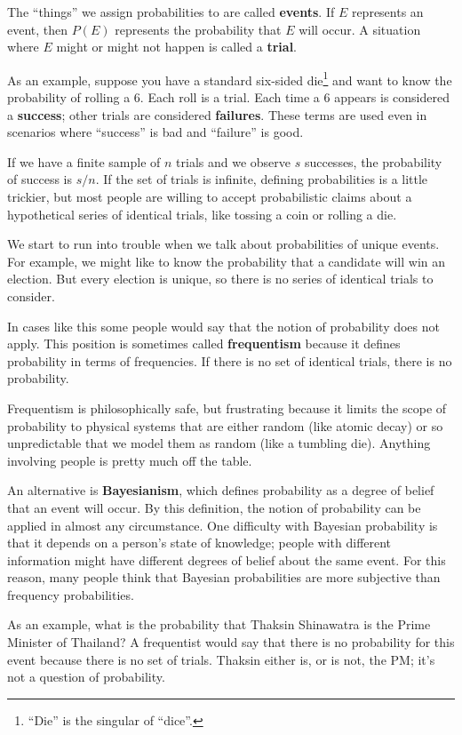 \documentclass[12pt]{book}
\begin{document}
The ``things'' we assign probabilities to are called {\bf events}.  If
$E$ represents an event, then $P(E)$ represents the probability that
$E$ will occur.  A situation where $E$ might or might not happen is
called a {\bf trial}.

As an example, suppose you have a standard six-sided
die\footnote{``Die'' is the singular of ``dice''.} and want to know
the probability of rolling a 6.  Each roll is a trial.
Each time a 6 appears is considered a {\bf success}; other trials are
considered {\bf failures}.  These terms are used even in scenarios
where ``success'' is bad and ``failure'' is good.

If we have a finite sample of $n$ trials and we observe $s$ successes,
the probability of success is $s/n$.  If the set of trials is
infinite, defining probabilities is a little trickier, but most people
are willing to accept probabilistic claims about a hypothetical series
of identical trials, like tossing a coin or rolling a die.

We start to run into trouble when we talk about probabilities of
unique events.  For example, we might like to know the probability
that a candidate will win an election.  But every election is unique,
so there is no series of identical trials to consider.

In cases like this some people would say that the notion of
probability does not apply.  This position is sometimes called {\bf
  frequentism} because it defines probability in terms of frequencies.
If there is no set of identical trials, there is no probability.

Frequentism is philosophically safe, but
frustrating because it limits the scope of probability to physical
systems that are either random (like atomic decay) or so unpredictable
that we model them as random (like a tumbling die).  Anything involving
people is pretty much off the table.

An alternative is {\bf Bayesianism}, which defines probability as
a degree of belief that an event will occur.  By this definition,
the notion of probability can be applied in almost any circumstance.
One difficulty with Bayesian probability is that it depends on
a person's state of knowledge; people with different information
might have different degrees of belief about the same event.  For
this reason, many people think that Bayesian probabilities are
more subjective than frequency probabilities.

As an example, what is the probability that Thaksin Shinawatra is the
Prime Minister of Thailand?  A frequentist would say that there is no
probability for this event because there is no set of
trials.  Thaksin either is, or is not, the PM; it's not a question of
probability.
\end{document}
